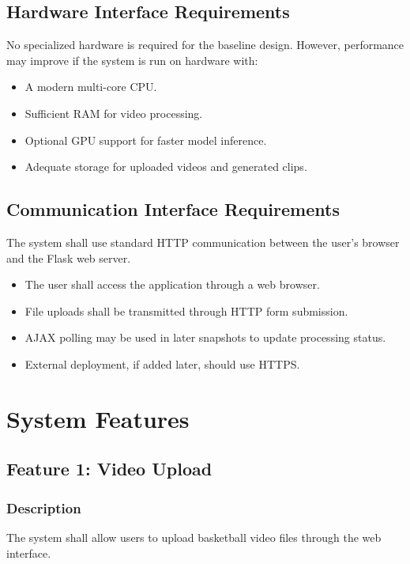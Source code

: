 \documentclass[12pt]{article}
\begin{document}
\subsection{Hardware Interface Requirements}
No specialized hardware is required for the baseline design. However, performance may improve if the system is run on hardware with:
\begin{itemize}[noitemsep]
    \item A modern multi-core CPU.
    \item Sufficient RAM for video processing.
    \item Optional GPU support for faster model inference.
    \item Adequate storage for uploaded videos and generated clips.
\end{itemize}

\subsection{Communication Interface Requirements}
The system shall use standard HTTP communication between the user's browser and the Flask web server.

\begin{itemize}[noitemsep]
    \item The user shall access the application through a web browser.
    \item File uploads shall be transmitted through HTTP form submission.
    \item AJAX polling may be used in later snapshots to update processing status.
    \item External deployment, if added later, should use HTTPS.
\end{itemize}

\newpage

\section{System Features}

\subsection{Feature 1: Video Upload}

\subsubsection{Description}
The system shall allow users to upload basketball video files through the web interface.
\end{document}
